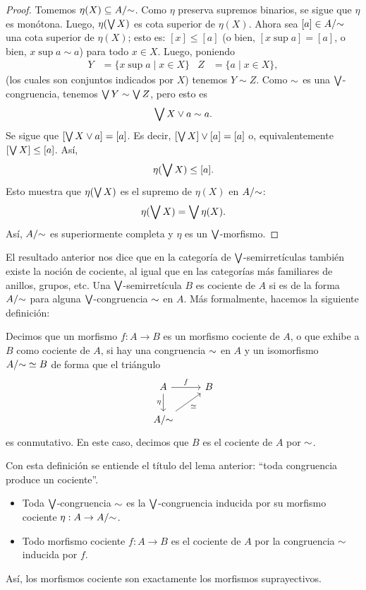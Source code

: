 \begin{proof}
  Tomemos $\eta(X)\subseteq A/{\sim}$.
  Como $\eta$ preserva supremos binarios,
  se sigue que $\eta$ es monótona.
  Luego, $\eta(\bigvee X)$ es cota superior de $\eta(X)$.
  Ahora sea $[a]\in A/{\sim}$ una cota superior de $\eta(X)$;
  esto es: $[x]\leq[a]$
  (o bien, $[x\sup a]=[a]$, o bien, $x\sup a\sim a$)
  para todo $x\in X$.
  Luego, poniendo
  \begin{align*}
      Y &= \{x\sup a\mid x\in X\}
      &
      Z &=\{a\mid x\in X\},
  \end{align*}
  (los cuales son conjuntos indicados por $X$)
  tenemos $Y\sim Z$.
  Como ${\sim}$ es una $\bigvee$-congruencia, tenemos
  $\bigvee Y\sim\bigvee Z$, pero esto es
  \[
      \bigvee X\vee a\sim a
  .\]
  Se sigue que $[\bigvee X\vee a]=[a]$. Es decir, $[\bigvee
  X]\vee[a]=[a]$ o, equivalentemente $[\bigvee X]\leq[a]$.
  Así,
  \[
      \eta(\bigvee X)\leq [a]
  .\]
  Esto muestra que $\eta(\bigvee X)$ es el supremo de $\eta(X)$
  en $A/{\sim}$:
  \[
    \eta(\bigvee X) = \bigvee \eta(X)
  .\]
  Así, $A/{\sim}$ es superiormente completa y
  $\eta$ es un $\bigvee$-morfismo.
\end{proof}

El resultado anterior nos dice que en la
categoría de $\bigvee$-semirretículas también existe la noción de
cociente, al igual que en las categorías más familiares de
anillos, grupos, etc. Una $\bigvee$-semirretícula $B$ es cociente de
$A$ si es de la forma $A/{\sim}$ para alguna $\bigvee$-congruencia
${\sim}$ en $A$. Más formalmente, hacemos la siguiente definición:
\begin{definition}
  Decimos que un morfismo $f:A\to B$ es un morfismo cociente de
  $A$, o que exhibe a $B$ como cociente de $A$, si hay una
  congruencia ${\sim}$ en $A$ y un isomorfismo $A/{\sim}\simeq B$
  de forma que el triángulo
  \[
    \begin{tikzcd}
      A \ar[d,"\eta"'] \ar[r,"f"] & B \\
      A/\simr \ar[ur,"\simeq"']
    \end{tikzcd}
  \]
  es conmutativo.
  En este caso, decimos que $B$ es el cociente de $A$ por
  ${\sim}$.
\end{definition}
Con esta definición se entiende el título del lema anterior:
``toda congruencia produce un cociente''.

\begin{remark}
\leavevmode
  \begin{itemize}
    \item
    Toda $\bigvee$-congruencia ${\sim}$ es la $\bigvee$-congruencia
    inducida por su morfismo cociente $\eta:A\to A/{\sim}$.
    \item
    Todo morfismo cociente $f:A\to B$ es el cociente de $A$ por la
    congruencia ${\sim}$ inducida por $f$.
  \end{itemize}
\end{remark}
Así, los morfismos cociente son exactamente los
morfismos suprayectivos.

